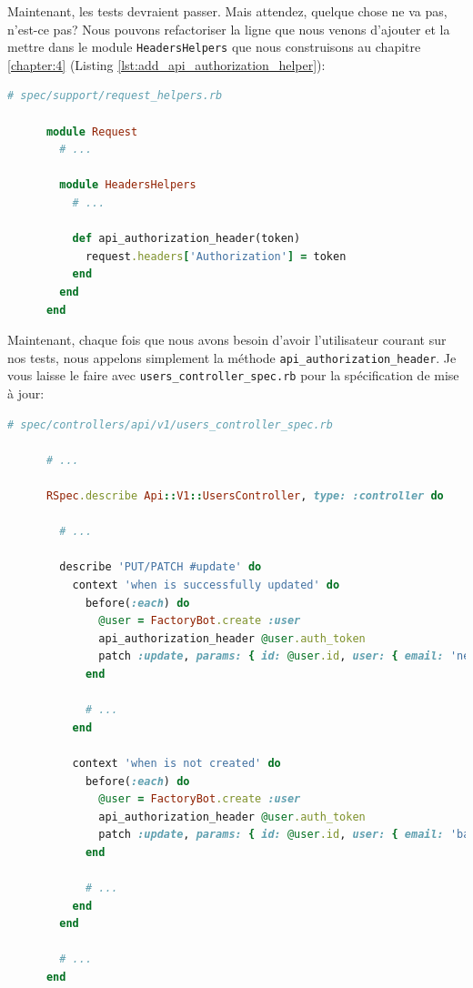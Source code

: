 \documentclass[]{report}
\begin{document}
    Maintenant, les tests devraient passer. Mais attendez, quelque chose ne va pas, n'est-ce pas? Nous pouvons refactoriser la ligne que nous venons d'ajouter et la mettre dans le module \verb|HeadersHelpers| que nous construisons au chapitre \ref{chapter:4} (Listing \ref{lst:add_api_authorization_helper}):

    \begin{scriptsize}
      \begin{lstlisting}[language=ruby, label={lst:add_api_authorization_helper}, caption={Factorisation de l'initialisation de l'en-tête Authorization}]
      # spec/support/request_helpers.rb

      module Request
        # ...

        module HeadersHelpers
          # ...

          def api_authorization_header(token)
            request.headers['Authorization'] = token
          end
        end
      end
      \end{lstlisting}
    \end{scriptsize}

    Maintenant, chaque fois que nous avons besoin d'avoir l'utilisateur courant sur nos tests, nous appelons simplement la méthode \verb|api_authorization_header|. Je vous laisse le faire avec \verb|users_controller_spec.rb| pour la spécification de mise à jour:

    \begin{scriptsize}
      \begin{lstlisting}[language=ruby]
      # spec/controllers/api/v1/users_controller_spec.rb

      # ...

      RSpec.describe Api::V1::UsersController, type: :controller do

        # ...

        describe 'PUT/PATCH #update' do
          context 'when is successfully updated' do
            before(:each) do
              @user = FactoryBot.create :user
              api_authorization_header @user.auth_token
              patch :update, params: { id: @user.id, user: { email: 'newmail@example.com' } }, format: :json
            end

            # ...
          end

          context 'when is not created' do
            before(:each) do
              @user = FactoryBot.create :user
              api_authorization_header @user.auth_token
              patch :update, params: { id: @user.id, user: { email: 'bademail.com' } }, format: :json
            end

            # ...
          end
        end

        # ...
      end
      \end{lstlisting}
    \end{scriptsize}
\end{document}
